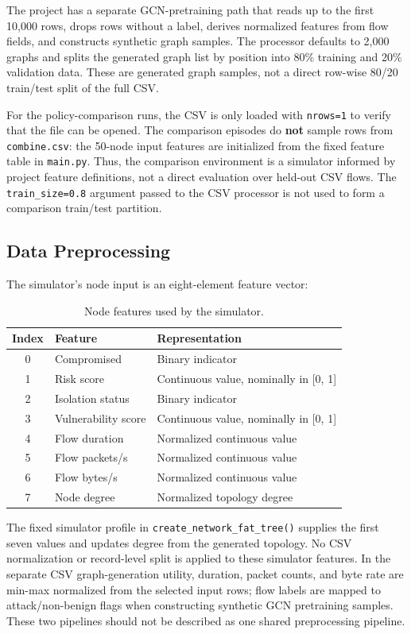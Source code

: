\documentclass[12pt,a4paper]{report}
\newcommand{\code}[1]{\texttt{#1}}
\begin{document}
The project has a separate GCN-pretraining path that reads up to the first 10,000 rows, drops rows without a label, derives normalized features from flow fields, and constructs synthetic graph samples. The processor defaults to 2,000 graphs and splits the generated graph list by position into 80\% training and 20\% validation data. These are generated graph samples, not a direct row-wise 80/20 train/test split of the full CSV.

For the policy-comparison runs, the CSV is only loaded with \code{nrows=1} to verify that the file can be opened. The comparison episodes do \textbf{not} sample rows from \code{combine.csv}: the 50-node input features are initialized from the fixed feature table in \code{main.py}. Thus, the comparison environment is a simulator informed by project feature definitions, not a direct evaluation over held-out CSV flows. The \code{train\_size=0.8} argument passed to the CSV processor is not used to form a comparison train/test partition.

\subsection{Data Preprocessing}

The simulator's node input is an eight-element feature vector:

\begin{table}[htbp]
\centering
\caption{Node features used by the simulator.}
\begin{tabular}{cll}
\toprule
\textbf{Index} & \textbf{Feature} & \textbf{Representation} \\
\midrule
0 & Compromised & Binary indicator \\
1 & Risk score & Continuous value, nominally in [0, 1] \\
2 & Isolation status & Binary indicator \\
3 & Vulnerability score & Continuous value, nominally in [0, 1] \\
4 & Flow duration & Normalized continuous value \\
5 & Flow packets/s & Normalized continuous value \\
6 & Flow bytes/s & Normalized continuous value \\
7 & Node degree & Normalized topology degree \\
\bottomrule
\end{tabular}
\end{table}

The fixed simulator profile in \code{create\_network\_fat\_tree()} supplies the first seven values and updates degree from the generated topology. No CSV normalization or record-level split is applied to these simulator features. In the separate CSV graph-generation utility, duration, packet counts, and byte rate are min-max normalized from the selected input rows; flow labels are mapped to attack/non-benign flags when constructing synthetic GCN pretraining samples. These two pipelines should not be described as one shared preprocessing pipeline.
\end{document}
